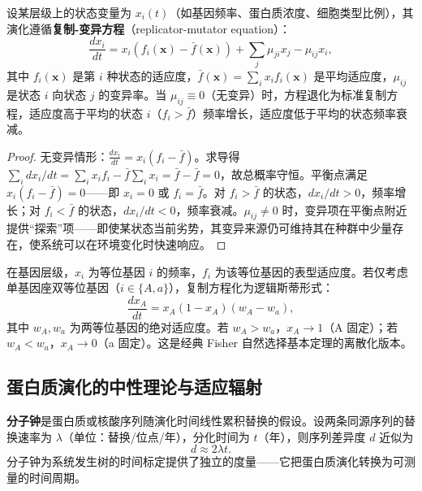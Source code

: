\begin{theorem}[优胜劣汰的通用数学形式]\label{thm:natural_selection_general}
设某层级上的状态变量为 $x_i(t)$（如基因频率、蛋白质浓度、细胞类型比例），其演化遵循\textbf{复制-变异方程}（replicator-mutator equation）：
\[
\frac{dx_i}{dt} = x_i \left( f_i(\mathbf{x}) - \bar f(\mathbf{x}) \right) + \sum_j \mu_{ji} x_j - \mu_{ij} x_i,
\]
其中 $f_i(\mathbf{x})$ 是第 $i$ 种状态的适应度，$\bar f(\mathbf{x}) = \sum_i x_i f_i(\mathbf{x})$ 是平均适应度，$\mu_{ij}$ 是状态 $i$ 向状态 $j$ 的变异率。当 $\mu_{ij} \equiv 0$（无变异）时，方程退化为标准复制方程，适应度高于平均的状态 $i$（$f_i > \bar f$）频率增长，适应度低于平均的状态频率衰减。
\end{theorem}

\begin{proof}
无变异情形：$\frac{dx_i}{dt} = x_i(f_i - \bar f)$。求导得 $\sum_i dx_i/dt = \sum_i x_i f_i - \bar f \sum_i x_i = \bar f - \bar f = 0$，故总概率守恒。平衡点满足 $x_i(f_i - \bar f) = 0$——即 $x_i = 0$ 或 $f_i = \bar f$。对 $f_i > \bar f$ 的状态，$dx_i/dt > 0$，频率增长；对 $f_i < \bar f$ 的状态，$dx_i/dt < 0$，频率衰减。$\mu_{ij} \neq 0$ 时，变异项在平衡点附近提供“探索”项——即使某状态当前劣势，其变异来源仍可维持其在种群中少量存在，使系统可以在环境变化时快速响应。
\end{proof}

\begin{corollary}[基因演化的复制方程]\label{cor:gene_replicator}
在基因层级，$x_i$ 为等位基因 $i$ 的频率，$f_i$ 为该等位基因的表型适应度。若仅考虑单基因座双等位基因（$i \in \{A, a\}$），复制方程化为逻辑斯蒂形式：
\[
\frac{dx_A}{dt} = x_A(1-x_A)(w_A - w_a),
\]
其中 $w_A, w_a$ 为两等位基因的绝对适应度。若 $w_A > w_a$，$x_A \to 1$（A 固定）；若 $w_A < w_a$，$x_A \to 0$（a 固定）。这是经典 Fisher 自然选择基本定理的离散化版本。
\end{corollary}

\subsection{蛋白质演化的中性理论与适应辐射}

\begin{definition}[分子钟]\label{def:molecular_clock}
\textbf{分子钟}是蛋白质或核酸序列随演化时间线性累积替换的假设。设两条同源序列的替换速率为 $\lambda$（单位：替换/位点/年），分化时间为 $t$（年），则序列差异度 $d$ 近似为
\[
d \approx 2\lambda t.
\]
分子钟为系统发生树的时间标定提供了独立的度量——它把蛋白质演化转换为可测量的时间周期。
\end{definition}

